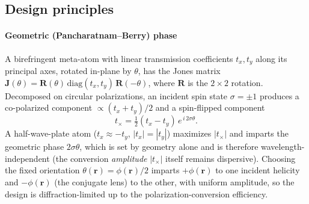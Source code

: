 \documentclass[preprint,12pt]{elsarticle}
\begin{document}
\subsection{Design principles}

\paragraph{Geometric (Pancharatnam--Berry) phase}
A birefringent meta-atom with linear transmission coefficients $t_x,t_y$ along its
principal axes, rotated in-plane by $\theta$, has the Jones matrix
$\mathbf{J}(\theta)=\mathbf{R}(\theta)\,\mathrm{diag}(t_x,t_y)\,\mathbf{R}(-\theta)$,
where $\mathbf{R}$ is the $2\times2$ rotation. Decomposed on circular
polarizations, an incident spin state $\sigma=\pm1$ produces a co-polarized
component $\propto (t_x+t_y)/2$ and a spin-flipped component
\begin{equation}
t_\times = \tfrac{1}{2}(t_x - t_y)\,e^{\,i\,2\sigma\theta}.
\label{eq:pb}
\end{equation}
A half-wave-plate atom ($t_x \approx -t_y$, $|t_x|=|t_y|$) maximizes $|t_\times|$
and imparts the geometric phase $2\sigma\theta$, which is set by geometry alone and is
therefore wavelength-independent (the conversion \emph{amplitude} $|t_\times|$ itself
remains dispersive). Choosing the fixed orientation $\theta(\mathbf{r})=\phi(\mathbf{r})/2$
imparts $+\phi(\mathbf{r})$ to one incident helicity and $-\phi(\mathbf{r})$ (the conjugate
lens) to the other, with uniform amplitude, so the design is diffraction-limited up to the
polarization-conversion efficiency.
\end{document}
